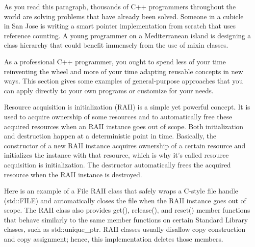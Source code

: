 
As you read this paragraph, thousands of C++ programmers throughout the world are solving problems that have already been solved. Someone in a cubicle in San Jose is writing a smart pointer implementation from scratch that uses reference counting. A young programmer on a Mediterranean island is designing a class hierarchy that could benefit immensely from the use of mixin classes.

As a professional C++ programmer, you ought to spend less of your time reinventing the wheel and more of your time adapting reusable concepts in new ways. This section gives some examples of general-purpose approaches that you can apply directly to your own programs or customize for your needs.


Resource acquisition is initialization (RAII) is a simple yet powerful concept. It is used to acquire ownership of some resources and to automatically free these acquired resources when an RAII instance goes out of scope. Both initialization and destruction happen at a deterministic point in time. Basically, the constructor of a new RAII instance acquires ownership of a certain resource and initializes the instance with that resource, which is why it’s called resource acquisition is initialization. The destructor automatically frees the acquired resource when the RAII instance is destroyed.

Here is an example of a File RAII class that safely wraps a C-style file handle (std::FILE) and automatically closes the file when the RAII instance goes out of scope. The RAII class also provides get(), release(), and reset() member functions that behave similarly to the same member functions on certain Standard Library classes, such as std::unique\_ptr. RAII classes usually disallow copy construction and copy assignment; hence, this implementation deletes those members.

